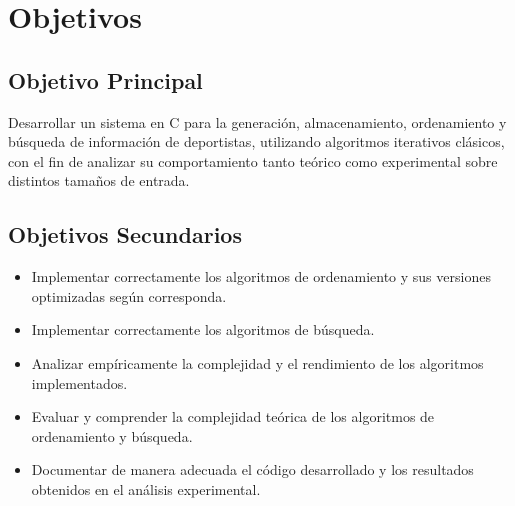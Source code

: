 \chapter{Objetivos}
\section{Objetivo Principal}
Desarrollar un sistema en C para la generación, almacenamiento, ordenamiento y búsqueda de información de deportistas, utilizando algoritmos iterativos clásicos, con el fin de analizar su comportamiento tanto teórico como experimental sobre distintos tamaños de entrada.
\section{Objetivos Secundarios}

\begin{itemize}
    \item Implementar correctamente los algoritmos de ordenamiento y sus versiones optimizadas según corresponda.
    \item Implementar correctamente los algoritmos de búsqueda.
    \item Analizar empíricamente la complejidad y el rendimiento de los algoritmos implementados.
    \item Evaluar y comprender la complejidad teórica de los algoritmos de ordenamiento y búsqueda.
    \item Documentar de manera adecuada el código desarrollado y los resultados obtenidos en el análisis experimental.
\end{itemize}